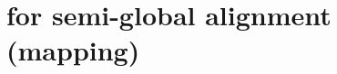 \chapter{\A for semi-global alignment (mapping)} \label{TRIEch:trie}

\graphicspath{{\dir/}}








